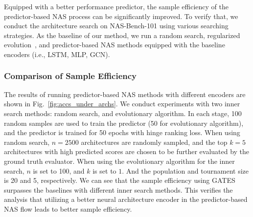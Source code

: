 \documentclass[runningheads]{llncs}
\begin{document}
Equipped with a better performance predictor, the sample efficiency of the predictor-based NAS process can be significantly improved. To verify that, we conduct the architecture search on NAS-Bench-101 using various searching strategies. As the baseline of our method, 
we run a random search, regularized evolution~\cite{real2019regularized},
and predictor-based NAS methods equipped with the baseline encoders (i.e., LSTM, MLP, GCN).



\begin{figure*}[bt]
\caption{Comparison of predictor-based NAS with different encoders: The best validation accuracy during the search process over 10/15 runs for the RS and EA inner serach method, respectively. $r$ is the sample ratio (see Sec.~\ref{sec:method-nas})}
\label{fig:accs_under_archs}
\end{figure*}


\begin{figure*}[tb]
\caption{Left: Number of architectures evaluated to acquire the best validation accuracy on NAS-Bench-101 over 100 runs. We use the mean validation accuracy as the search reward. GATES-powered predictor-based NAS is 511.0$\times$ and 59.25$\times$ more sample efficient than random search and regularized evolution. Right: 
  Number of architectures evaluated to acquire the best validation accuracy over 10 runs with different $r$}
\label{fig:box_ablation}
\end{figure*}


\subsubsection{Comparison of Sample Efficiency}
The results of running predictor-based NAS methods with different encoders are shown in Fig.~\ref{fig:accs_under_archs}. We conduct experiments with two inner search methods: random search, and evolutionary algorithm. 
In each stage, 100 random samples are used to train the predictor (50 for evolutionary algorithm), and the predictor is trained for 50 epochs with hinge ranking loss. When using random search, $n=2500$ architectures are randomly sampled, and the top $k=5$ architectures with high predicted scores are chosen to be further evaluated by the ground truth evaluator. When using the evolutionary algorithm for the inner search, $n$ is set to 100, and $k$ is set to $1$. And the population and tournament size is 20 and 5, respectively. 
We can see that the sample efficiency using GATES surpasses the baselines with different inner search methods. This verifies the analysis that utilizing a better neural architecture encoder in the predictor-based NAS flow leads to better sample efficiency.
\end{document}
